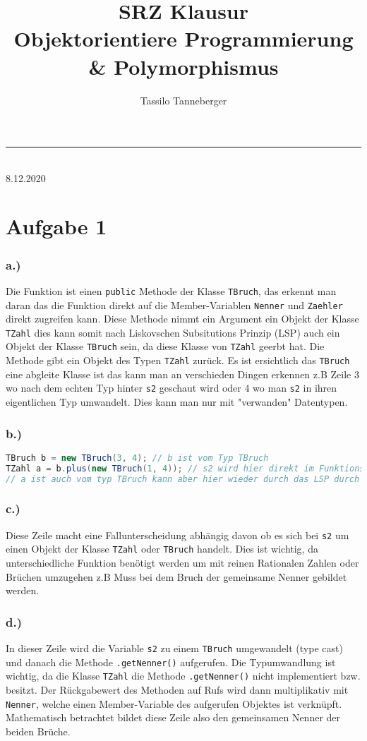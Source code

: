 \documentclass[12pt]{article}
\title{SRZ Klausur\\Objektorientiere Programmierung \& Polymorphismus}
\author{Tassilo Tanneberger}
\makeatletter
\newcommand{\linia}{\rule{\linewidth}{1pt}}
\renewcommand{\maketitle}{
\begin{center}
\huge \@title
\end{center}
\linia\\
{\large\@author\hfill 8.12.2020\\}}
\makeatother
\begin{document}
\maketitle

\section*{Aufgabe 1}
\subsubsection*{a.)}
Die Funktion ist einen \verb|public| Methode der Klasse \verb|TBruch|, das erkennt man daran das die Funktion direkt auf die Member-Variablen \verb|Nenner| und \verb|Zaehler| direkt zugreifen kann. Diese Methode nimmt ein Argument ein Objekt der Klasse \verb|TZahl| dies kann somit nach Liskovschen Subsitutions Prinzip (LSP) auch ein Objekt der Klasse \verb|TBruch| sein, da diese Klasse von \verb|TZahl| geerbt hat. Die Methode gibt ein Objekt des Typen \verb|TZahl| zurück. Es ist ersichtlich das \verb|TBruch| eine abgleite Klasse ist das kann man an verschieden Dingen erkennen z.B Zeile 3 wo nach dem echten Typ hinter \verb|s2| geschaut wird oder 4 wo man \verb|s2| in ihren eigentlichen Typ umwandelt. Dies kann man nur mit "verwanden" Datentypen.


\subsubsection*{b.)}
\lstset{language=Java}
\begin{lstlisting}[language=Java]
TBruch b = new TBruch(3, 4); // b ist vom Typ TBruch
TZahl a = b.plus(new TBruch(1, 4)); // s2 wird hier direkt im Funktionsaufruf erzeugt auch TBruch
// a ist auch vom typ TBruch kann aber hier wieder durch das LSP durch TZahl ausgedrückt werden
\end{lstlisting}

\subsubsection*{c.)}
Diese Zeile macht eine Fallunterscheidung abhängig davon ob es sich bei \verb|s2| um einen Objekt der Klasse \verb|TZahl| oder \verb|TBruch| handelt. Dies ist wichtig, da unterschiedliche Funktion benötigt werden um mit reinen Rationalen Zahlen oder Brüchen umzugehen z.B Muss bei dem Bruch der gemeinsame Nenner gebildet werden.

\subsubsection*{d.)}
In dieser Zeile wird die Variable \verb|s2| zu einem \verb|TBruch| umgewandelt (type cast) und danach die Methode \verb|.getNenner()| aufgerufen. Die Typumwandlung ist wichtig, da die Klasse \verb|TZahl| die Methode  \verb|.getNenner()| nicht implementiert bzw. besitzt. Der Rückgabewert des Methoden auf Rufs wird dann multiplikativ mit \verb|Nenner|, welche einen Member-Variable des aufgerufen Objektes ist verknüpft. Mathematisch betrachtet bildet diese Zeile also den gemeinsamen Nenner der beiden Brüche. 
\end{document}
